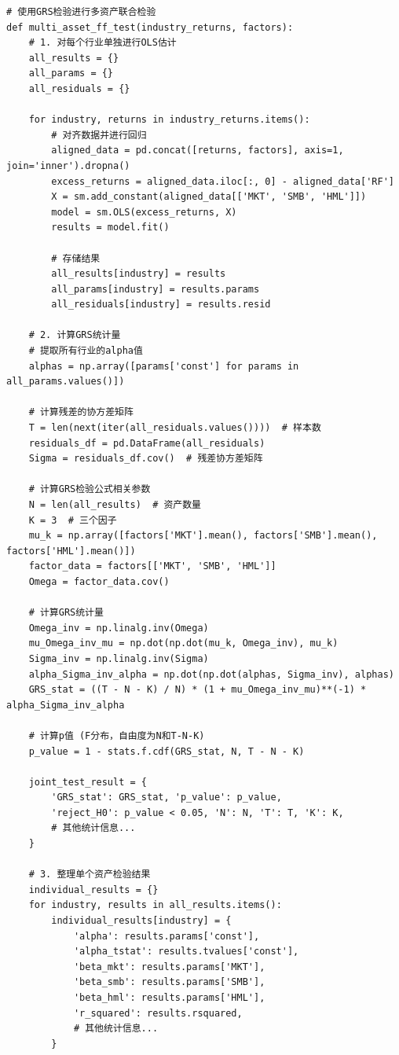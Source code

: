 \documentclass[12pt, a4paper]{article}
\begin{document}
\begin{lstlisting}[basicstyle=\small\ttfamily, breaklines=true, columns=fullflexible]
# 使用GRS检验进行多资产联合检验
def multi_asset_ff_test(industry_returns, factors):
    # 1. 对每个行业单独进行OLS估计
    all_results = {}
    all_params = {}
    all_residuals = {}
    
    for industry, returns in industry_returns.items():
        # 对齐数据并进行回归
        aligned_data = pd.concat([returns, factors], axis=1, join='inner').dropna()
        excess_returns = aligned_data.iloc[:, 0] - aligned_data['RF']
        X = sm.add_constant(aligned_data[['MKT', 'SMB', 'HML']])
        model = sm.OLS(excess_returns, X)
        results = model.fit()
        
        # 存储结果
        all_results[industry] = results
        all_params[industry] = results.params
        all_residuals[industry] = results.resid
    
    # 2. 计算GRS统计量
    # 提取所有行业的alpha值
    alphas = np.array([params['const'] for params in all_params.values()])
    
    # 计算残差的协方差矩阵
    T = len(next(iter(all_residuals.values())))  # 样本数
    residuals_df = pd.DataFrame(all_residuals)
    Sigma = residuals_df.cov()  # 残差协方差矩阵
    
    # 计算GRS检验公式相关参数
    N = len(all_results)  # 资产数量
    K = 3  # 三个因子
    mu_k = np.array([factors['MKT'].mean(), factors['SMB'].mean(), factors['HML'].mean()])
    factor_data = factors[['MKT', 'SMB', 'HML']]
    Omega = factor_data.cov()
    
    # 计算GRS统计量
    Omega_inv = np.linalg.inv(Omega)
    mu_Omega_inv_mu = np.dot(np.dot(mu_k, Omega_inv), mu_k)
    Sigma_inv = np.linalg.inv(Sigma)
    alpha_Sigma_inv_alpha = np.dot(np.dot(alphas, Sigma_inv), alphas)
    GRS_stat = ((T - N - K) / N) * (1 + mu_Omega_inv_mu)**(-1) * alpha_Sigma_inv_alpha
    
    # 计算p值 (F分布，自由度为N和T-N-K)
    p_value = 1 - stats.f.cdf(GRS_stat, N, T - N - K)
    
    joint_test_result = {
        'GRS_stat': GRS_stat, 'p_value': p_value,
        'reject_H0': p_value < 0.05, 'N': N, 'T': T, 'K': K,
        # 其他统计信息...
    }
    
    # 3. 整理单个资产检验结果
    individual_results = {}
    for industry, results in all_results.items():
        individual_results[industry] = {
            'alpha': results.params['const'],
            'alpha_tstat': results.tvalues['const'],
            'beta_mkt': results.params['MKT'],
            'beta_smb': results.params['SMB'],
            'beta_hml': results.params['HML'],
            'r_squared': results.rsquared,
            # 其他统计信息...
        }
    

\end{lstlisting}
\end{document}
